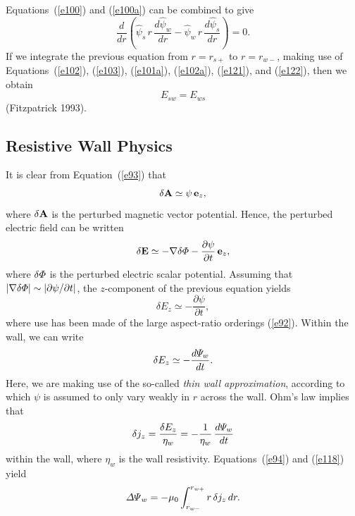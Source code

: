 \documentclass[notitlepage,12pt]{article}
\begin{document}
Equations~(\ref{e100}) and (\ref{e100a}) can be combined to give
\begin{equation}
\frac{d}{dr}\!\left(\hat{\psi}_s\,r\,\frac{d\hat{\psi}_w}{dr} - \hat{\psi}_w\,r\,\frac{d\hat{\psi}_s}{dr}\right) = 0.
\end{equation}
If we integrate the previous equation from $r=r_{s+}$ to $r=r_{w-}$, making use of Equations~(\ref{e102}), (\ref{e103}), (\ref{e101a}), (\ref{e102a}), (\ref{e121}),
and (\ref{e122}), then we obtain
\begin{equation}\label{e123}
E_{sw} = E_{ws}
\end{equation}
(Fitzpatrick 1993). 

\subsection{Resistive Wall Physics}\label{tauw}
It is clear from Equation~(\ref{e93}) that
\begin{equation}
\delta {\bf A} \simeq \psi\,{\bf e}_z,
\end{equation}
where $\delta {\bf A}$ is the perturbed magnetic vector potential. 
Hence, the perturbed electric field can be written
\begin{equation}
\delta {\bf E} \simeq -\nabla\delta{\mit\Phi} - \frac{\partial\psi}{\partial t}\,{\bf e}_z,
\end{equation}
where $\delta{\mit\Phi}$ is the perturbed electric scalar potential. 
Assuming that $|\nabla\delta{\mit\Phi}|\sim |\partial\psi/\partial t|$, the $z$-component of the previous
equation yields
\begin{equation}
\delta E_z\simeq -\frac{\partial\psi}{\partial t},
\end{equation}
where use has been made of the large aspect-ratio orderings (\ref{e92}). Within the wall, we
can write
\begin{equation}
\delta E_z \simeq -\frac{d{\mit\Psi}_w}{dt}.
\end{equation}
Here, we are making use of the so-called {\em thin wall approximation}, according to which $\psi$ is assumed to only vary weakly in $r$ across 
the wall. Ohm's law implies that
\begin{equation}
\delta j_z = \frac{\delta E_z}{\eta_w} = -\frac{1}{\eta_w}\,\frac{d{\mit\Psi}_w}{dt}
\end{equation}
within the wall, where $\eta_w$ is the wall resistivity. Equations~(\ref{e94}) and (\ref{e118}) yield
\begin{equation}\label{e132}
{\mit\Delta\Psi}_w = -\mu_0\int_{r_{w-}}^{r_{w+}}r\,\delta j_z\,dr.
\end{equation}
\end{document}
